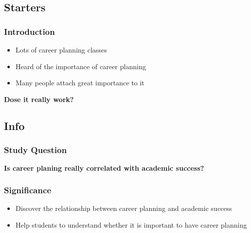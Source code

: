 \subsection{Starters}
\begin{frame}
    \frametitle{Introduction}
    \Large
    \begin{itemize}[<+->]
        \item Lots of career planning classes
        \item Heard of the importance of career planning
        \item Many people attach great importance to it
    \end{itemize}
    \begin{center}
        \LARGE
        \textbf{Dose it really work?} 
    \end{center}
\end{frame}

\subsection{Info}
\begin{frame}
    \frametitle{Study Question}
    \Huge
    \begin{center}
        \textbf{Is career planing really correlated with academic success?}        
    \end{center}
\end{frame}

\begin{frame}
    \frametitle{Significance}  
    \Large
    \begin{itemize}
        \item Discover the relationship between career planning and academic success
        \item Help students to understand whether it is important to have career planning
    \end{itemize}
\end{frame}